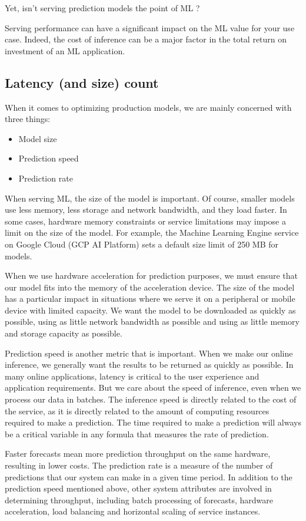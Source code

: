 Yet, isn't serving prediction models the point of ML ?

Serving performance can have a significant impact on the ML value for your use case. Indeed, the cost of inference can be a major factor in the total return on investment of an ML application.

\subsection{Latency (and size) count}
When it comes to optimizing production models, we are mainly concerned with three things:
\begin{itemize}
    \item Model size
    \item Prediction speed
    \item Prediction rate
\end{itemize}

When serving ML, the size of the model is important. Of course, smaller models use less memory, less storage and network bandwidth, and they load faster. In some cases, hardware memory constraints or service limitations may impose a limit on the size of the model. For example, the Machine Learning Engine service on Google Cloud (GCP AI Platform) sets a default size limit of 250 MB for models. 

When we use hardware acceleration for prediction purposes, we must ensure that our model fits into the memory of the acceleration device. The size of the model has a particular impact in situations where we serve it on a peripheral or mobile device with limited capacity. We want the model to be downloaded as quickly as possible, using as little network bandwidth as possible and using as little memory and storage capacity as possible.

Prediction speed is another metric that is important. When we make our online inference, we generally want the results to be returned as quickly as possible. In many online applications, latency is critical to the user experience and application requirements. But we care about the speed of inference, even when we process our data in batches. The inference speed is directly related to the cost of the service, as it is directly related to the amount of computing resources required to make a prediction. The time required to make a prediction will always be a critical variable in any formula that measures the rate of prediction. 

Faster forecasts mean more prediction throughput on the same hardware, resulting in lower costs.
The prediction rate is a measure of the number of predictions that our system can make in a given time period. In addition to the prediction speed mentioned above, other system attributes are involved in determining throughput, including batch processing of forecasts, hardware acceleration, load balancing and horizontal scaling of service instances.


